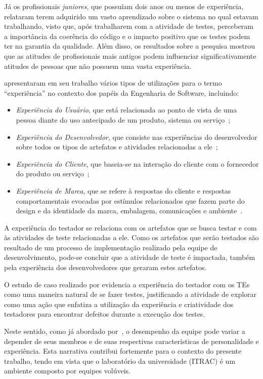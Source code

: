 Já os profissionais \textit{juniores}, que possuíam dois anos ou menos de experiência, relataram terem adquirido um vasto aprendizado sobre o sistema no qual estavam trabalhando, visto que, após trabalharem com a atividade de testes, perceberam a importância da coerência do código e o impacto positivo que os testes podem ter na garantia da qualidade. Além disso, os resultados sobre a pesquisa mostrou que as atitudes de profissionais mais antigos podem influenciar significativamente atitudes de pessoas que não possuem uma vasta experiência. 

\cite{ekwoge2017tester} apresentaram em seu trabalho vários tipos de utilizações para o termo ``experiência'' no contexto dos papéis da Engenharia de Software, incluindo: 


\begin{itemize}
    \item  \textit{Experiência do Usuário}, que está relacionada ao ponto de vista de uma pessoa diante do uso antecipado de um produto, sistema ou serviço~\cite{hassenzahl2008user};
    \item  \textit{Experiência do Desenvolvedor}, que consiste nas experiências do desenvolvedor sobre todos os tipos de artefatos e atividades relacionadas a ele~\cite{fagerholm2012developer};
    \item  \textit{Experiência do Cliente}, que baseia-se na interação do cliente com o fornecedor do produto ou serviço~\cite{palmer2010customer};
    \item \textit{Experiência de Marca}, que se refere à respostas do cliente e respostas comportamentais evocadas por estímulos relacionados que fazem parte do design e da identidade da marca, embalagem, comunicações e ambiente~\cite{brakus2009brand}.
\end{itemize}

A experiência do testador se relaciona com os artefatos que se busca testar e com às atividades de teste relacionadas a ele. Como os artefatos que serão testados são resultado de um processo de implementação realizado pela equipe de desenvolvimento, pode-se concluir que a atividade de teste é impactada, também pela experiência dos desenvolvedores que geraram estes artefatos.

O estudo de caso realizado por \cite{itkonen2015test} evidencia a experiência do testador com os TEs como uma maneira natural de se fazer testes, justificando a atividade de explorar como uma ação que enfatiza a utilização da experiência e criatividade dos testadores para encontrar defeitos durante a execução dos testes. 

Neste sentido, como já abordado por~\cite{cruz2011personality}, o desempenho da equipe pode variar a depender de seus membros e de suas respectivas características de personalidade e experiência. Esta narrativa contribui fortemente para o contexto do presente trabalho, tendo em vista que o laboratório da universidade (ITRAC) é um ambiente composto por equipes volúveis.


